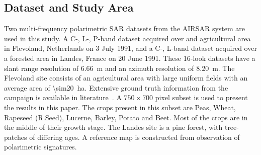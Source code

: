 

\subsection{Dataset and Study Area}

Two multi-frequency polarimetric SAR datasets from the AIRSAR system are used in this study. A C-, L-, P-band dataset  acquired over and agricultural area in Flevoland, Netherlands on 3 July 1991, and a C-, L-band dataset acquired over a forested area in Landes, France on 20 June 1991.
These 16-look datasets have a slant range resolution of \SI{6.66}{m} and an azimuth resolution of \SI{8.20}{m}. 
The Flevoland site consists of an agricultural area with large uniform fields with an average area of \SI{\sim20}{ha}. Extensive ground truth information from the campaign is available in literature~\cite{vissers1992groundtruth}.  
A $750\times700$ pixel subset is used to present the results in this paper. The crops present in this subset are Peas, Wheat, Rapeseed (R.Seed), Lucerne, Barley, Potato and Beet. Most of the crops are in the middle of their growth stage.  
The Landes site is a pine forest, with tree-patches of differing ages. A reference map is constructed from observation of polarimetric signatures.







